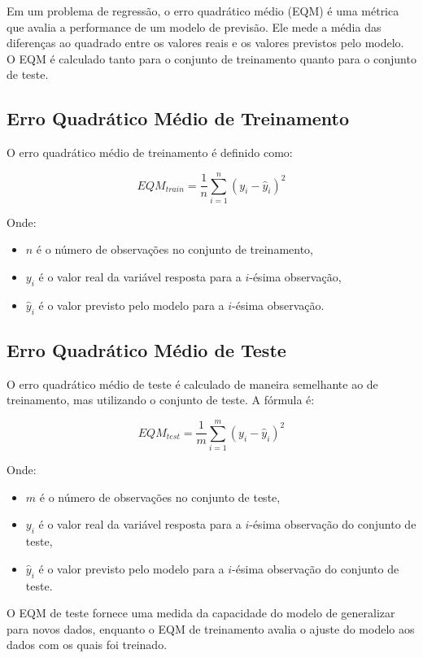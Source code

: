 \documentclass{sciposter}
\begin{document}
\begin{multicols}{3}
Em um problema de regressão, o erro quadrático médio (EQM) é uma métrica que avalia a performance de um modelo de previsão. Ele mede a média das diferenças ao quadrado entre os valores reais e os valores previstos pelo modelo. O EQM é calculado tanto para o conjunto de treinamento quanto para o conjunto de teste.

\subsection{Erro Quadrático Médio de Treinamento}
O erro quadrático médio de treinamento é definido como:

\[
EQM_{train} = \frac{1}{n} \sum_{i=1}^{n} (y_i - \hat{y}_i)^2
\]

Onde:
\begin{itemize}
    \item \( n \) é o número de observações no conjunto de treinamento,
    \item \( y_i \) é o valor real da variável resposta para a \(i\)-ésima observação,
    \item \( \hat{y}_i \) é o valor previsto pelo modelo para a \(i\)-ésima observação.
\end{itemize}

\subsection{Erro Quadrático Médio de Teste}
O erro quadrático médio de teste é calculado de maneira semelhante ao de treinamento, mas utilizando o conjunto de teste. A fórmula é:

\[
EQM_{test} = \frac{1}{m} \sum_{i=1}^{m} (y_i - \hat{y}_i)^2
\]

Onde:
\begin{itemize}
    \item \( m \) é o número de observações no conjunto de teste,
    \item \( y_i \) é o valor real da variável resposta para a \(i\)-ésima observação do conjunto de teste,
    \item \( \hat{y}_i \) é o valor previsto pelo modelo para a \(i\)-ésima observação do conjunto de teste.
\end{itemize}

O EQM de teste fornece uma medida da capacidade do modelo de generalizar para novos dados, enquanto o EQM de treinamento avalia o ajuste do modelo aos dados com os quais foi treinado.

\end{multicols}
\end{document}
